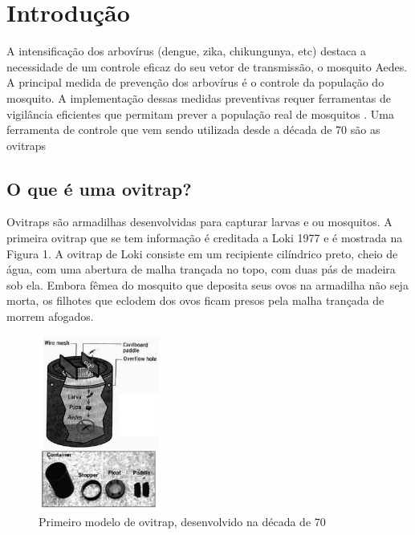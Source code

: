 \documentclass[
	12pt,				%
	openright,			%
	oneside,			%
	a4paper,			%
	chapter=TITLE,		%
	english,			%
	brazil				%
	]{abntex2}
\begin{document}
\tableofcontents*
\cleardoublepage



\textual


\setcounter{page}{12}

\chapter{Introdução}
A intensificação dos arbovírus (dengue, zika, chikungunya, etc) destaca a necessidade de
um controle eficaz do seu vetor de transmissão, o mosquito Aedes. A principal
medida de prevenção dos arbovírus é o controle da população do mosquito. A
implementação dessas medidas preventivas requer ferramentas de vigilância eficientes que
permitam prever a população real de mosquitos \cite{ISMALIZA2019}. Uma ferramenta de controle que vem
sendo utilizada desde a década de 70 são as ovitraps \cite{LOK1977}

\section{O que é uma ovitrap?}

Ovitraps são armadilhas desenvolvidas para capturar larvas e ou mosquitos. A primeira ovitrap que se tem informação é creditada a Loki 1977 \cite{LOK1977}e é mostrada na Figura 1. A ovitrap de Loki consiste em um recipiente cilíndrico preto, cheio de água,
com uma abertura de malha trançada no topo, com duas pás de madeira sob ela. Embora
fêmea do mosquito que deposita seus ovos na armadilha não seja morta, os filhotes que
eclodem dos ovos ficam presos pela malha trançada de morrem afogados.

\begin{figure}[h!]
\centering
\includegraphics[width=4cm]{imagens/ovitrapLoki.jpg}
\caption{Primeiro modelo de ovitrap, desenvolvido na década de 70}
    \label{fig:OvitrapLoki}
\end{figure}
\end{document}
